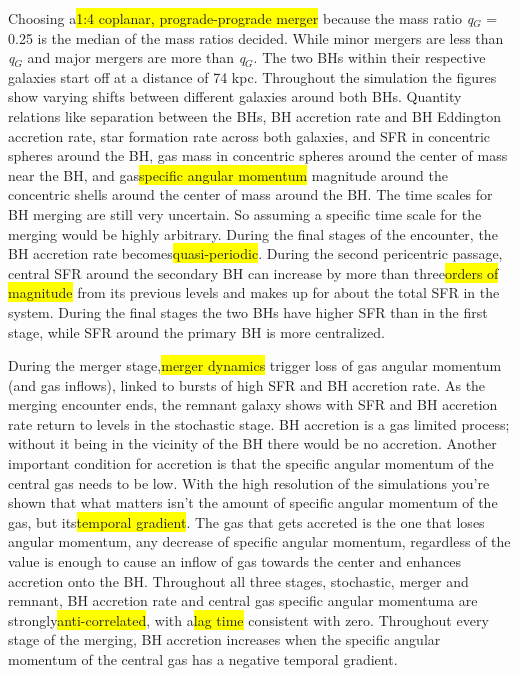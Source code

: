 \documentclass{article}
\begin{document}
\par   Choosing a\colorbox{yellow}{1:4 coplanar, prograde-prograde merger} because the mass ratio \textit{q}${_G}$ = 0.25 is the median of the mass ratios decided. While minor mergers are less than \textit{q}${_G}$ and major mergers are more than \textit{q}${_G}$. The two BHs within their respective galaxies start off at a distance of 74 kpc. Throughout the simulation the figures show varying shifts between different galaxies around both BHs. Quantity relations like separation between the BHs, BH accretion rate and BH Eddington accretion rate, star formation rate across both galaxies, and SFR in concentric spheres around the BH, gas mass in concentric spheres around the center of mass near the BH, and gas\colorbox{yellow}{specific angular momentum} magnitude around the concentric shells around the center of mass around the BH. The time scales for BH merging are still very uncertain. So assuming a specific time scale for the merging would be highly arbitrary. During the final stages of the encounter, the BH accretion rate becomes\colorbox{yellow}{quasi-periodic}. During the second pericentric passage, central SFR around the secondary BH can increase by more than three\colorbox{yellow}{orders of magnitude} from its previous levels and makes up for about the total SFR in the system. During the final stages the two BHs have higher SFR than in the first stage, while SFR around the primary BH is more centralized.
\par   During the merger stage,\colorbox{yellow}{merger dynamics} trigger loss of gas angular momentum (and gas inflows), linked to bursts of high SFR and BH accretion rate. As the merging encounter ends, the remnant galaxy shows with SFR and BH accretion rate return to levels in the stochastic stage. BH accretion is a gas limited process; without it being in the vicinity of the BH there would be no accretion. Another important condition for accretion is that the specific angular momentum of the central gas needs to be low. With the high resolution of the simulations you're shown that what matters isn't the amount of specific angular momentum of the gas, but its\colorbox{yellow}{temporal gradient}. The gas that gets accreted is the one that loses angular momentum, any decrease of specific angular momentum, regardless of the value is enough to cause an inflow of gas towards the center and enhances accretion onto the BH. Throughout all three stages, stochastic, merger and remnant, BH accretion rate and central gas specific angular momentuma are strongly\colorbox{yellow}{anti-correlated}, with a\colorbox{yellow}{lag time} consistent with zero. Throughout every stage of the merging, BH accretion increases when the specific angular momentum of the central gas has a negative temporal gradient.
\end{document}
